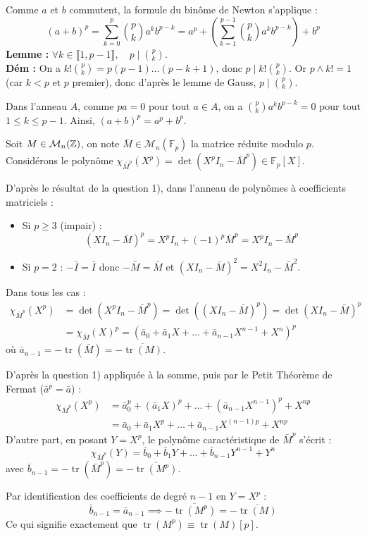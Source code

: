 \begin{solution}
Comme $a$ et $b$ commutent, la formule du binôme de Newton s'applique :
\[ (a+b)^p = \sum_{k=0}^p \binom{p}{k} a^k b^{p-k} = a^p + \left( \sum_{k=1}^{p-1} \binom{p}{k} a^k b^{p-k} \right) + b^p \]
\textbf{Lemme :} $\forall k \in \llbracket 1, p-1 \rrbracket, \quad p \mid \binom{p}{k}$. \\
\textbf{Dém :} On a $k! \binom{p}{k} = p(p-1)\dots(p-k+1)$, donc $p \mid k! \binom{p}{k}$. Or $p \wedge k! = 1$ (car $k < p$ et $p$ premier), donc d'après le lemme de Gauss, $p \mid \binom{p}{k}$.

Dans l'anneau $A$, comme $pa = 0$ pour tout $a \in A$, on a $\binom{p}{k} a^k b^{p-k} = 0$ pour tout $1 \leq k \leq p-1$.
Ainsi, $\boxed{(a+b)^p = a^p + b^p}$.

Soit $M \in \mathcal{M}_n(\mathbb Z)$, on note $\bar{M} \in \mathcal{M}_n(\mathbb{F}_p)$ la matrice réduite modulo $p$.
Considérons le polynôme $\chi_{\bar{M}^p}(X^p) = \det(X^p I_n - \bar{M}^p) \in \mathbb{F}_p[X]$.

D'après le résultat de la question 1), dans l'anneau de polynômes à coefficients matriciels :
\begin{itemize}
  \item Si $p \geq 3$ (impair) :
  \[ (X I_n - \bar{M})^p = X^p I_n + (-1)^p \bar{M}^p = X^p I_n - \bar{M}^p \]
  \item Si $p = 2$ : $-\bar{I} = \bar{I}$ donc $-\bar{M} = \bar{M}$ et $(X I_n - \bar{M})^2 = X^2 I_n - \bar{M}^2$.
\end{itemize}

Dans tous les cas :
\begin{align*}
\chi_{\bar{M}^p}(X^p) &= \det(X^p I_n - \bar{M}^p) = \det\left( (X I_n - \bar{M})^p \right) = \det(X I_n - \bar{M})^p \\
&= \chi_{\bar{M}}(X)^p = \left( \bar{a}_0 + \bar{a}_1 X + \dots + \bar{a}_{n-1} X^{n-1} + X^n \right)^p
\end{align*}
où $\bar{a}_{n-1} = -\operatorname{tr}(\bar{M}) = -\overline{\operatorname{tr}(M)}$.

D'après la question 1) appliquée à la somme, puis par le Petit Théorème de Fermat ($\bar{a}^p = \bar{a}$) :
\begin{align*}
\chi_{\bar{M}^p}(X^p) &= \bar{a}_0^p + (\bar{a}_1 X)^p + \dots + (\bar{a}_{n-1} X^{n-1})^p + X^{np} \\
&= \bar{a}_0 + \bar{a}_1 X^p + \dots + \bar{a}_{n-1} X^{(n-1)p} + X^{np}
\end{align*}
D'autre part, en posant $Y = X^p$, le polynôme caractéristique de $\bar{M}^p$ s'écrit :
\[ \chi_{\bar{M}^p}(Y) = \bar{b}_0 + \bar{b}_1 Y + \dots + \bar{b}_{n-1} Y^{n-1} + Y^n \]
avec $\bar{b}_{n-1} = -\operatorname{tr}(\bar{M}^p) = -\overline{\operatorname{tr}(M^p)}$.

Par identification des coefficients de degré $n-1$ en $Y = X^p$ :
\[ \bar{b}_{n-1} = \bar{a}_{n-1} \implies -\overline{\operatorname{tr}(M^p)} = -\overline{\operatorname{tr}(M)} \]
Ce qui signifie exactement que $\boxed{\operatorname{tr}(M^p) \equiv \operatorname{tr}(M) [p]}$.
\end{solution}

